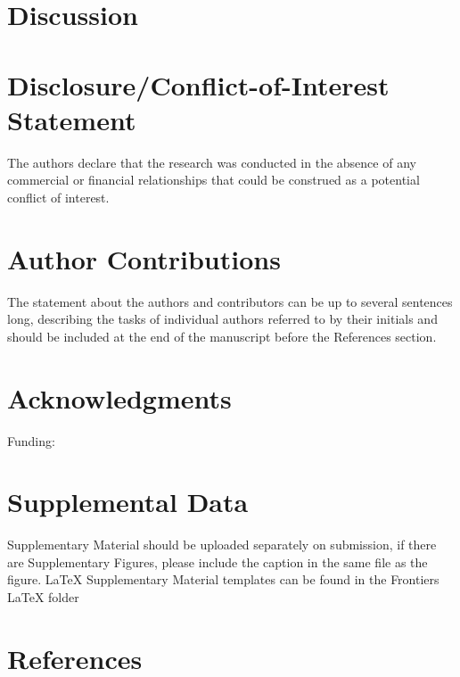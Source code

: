 \documentclass[]{article}
\begin{document}
\hypertarget{discussion}{%
\section{Discussion}\label{discussion}}

\hypertarget{disclosureconflict-of-interest-statement}{%
\section*{Disclosure/Conflict-of-Interest Statement}\label{disclosureconflict-of-interest-statement}}

The authors declare that the research was conducted in the absence of any
commercial or financial relationships that could be construed as a potential
conflict of interest.

\hypertarget{author-contributions}{%
\section*{Author Contributions}\label{author-contributions}}

The statement about the authors and contributors can be up to several sentences
long, describing the tasks of individual authors referred to by their initials
and should be included at the end of the manuscript before the References
section.

\hypertarget{acknowledgments}{%
\section*{Acknowledgments}\label{acknowledgments}}

Funding:

\hypertarget{supplemental-data}{%
\section{Supplemental Data}\label{supplemental-data}}

Supplementary Material should be uploaded separately on submission, if there are
Supplementary Figures, please include the caption in the same file as the
figure. LaTeX Supplementary Material templates can be found in the Frontiers
LaTeX folder

\hypertarget{references}{%
\section{References}\label{references}}
\end{document}
